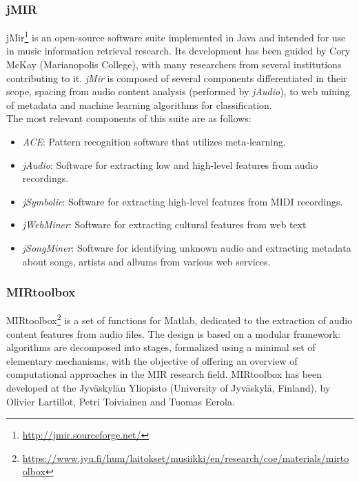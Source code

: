 \subsubsection*{jMIR}
jMir\footnote{\url{http://jmir.sourceforge.net/}} is an open-source software suite implemented in Java and intended for use in music information retrieval research. Its development has been guided by Cory McKay (Marianopolis College), with many researchers from several institutions contributing to it. \textit{jMir} is composed of several components differentiated in their scope, spacing from audio content analysis (performed by \textit{jAudio}), to web mining of metadata and machine learning algorithms for classification. \\ The most relevant components of this suite are as follows:
\begin{itemize}
\item \textit{ACE}: Pattern recognition software that utilizes meta-learning. 
\item \textit{jAudio}: Software for extracting low and high-level features from audio recordings.
\item \textit{jSymbolic}: Software for extracting high-level features from MIDI recordings.
\item \textit{jWebMiner}: Software for extracting cultural features from web text
\item \textit{jSongMiner}: Software for identifying unknown audio and extracting metadata about songs, artists and albums from various web services.
\end{itemize}


\subsubsection*{MIRtoolbox}
MIRtoolbox\footnote{\url{https://www.jyu.fi/hum/laitokset/musiikki/en/research/coe/materials/mirtoolbox}} is a set of functions for Matlab, dedicated to the extraction of audio content features from audio files. The design is based on a modular framework: algorithms are decomposed into stages, formalized using a minimal set of elementary mechanisms, with the objective of offering an overview of computational approaches in the MIR research field. MIRtoolbox has been developed at the Jyväskylän Yliopisto (University of Jyväskylä, Finland), by Olivier Lartillot, Petri Toiviainen and Tuomas Eerola.



